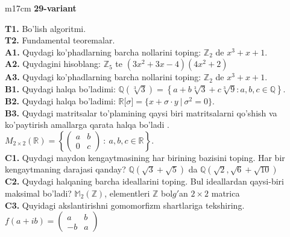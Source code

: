 \documentclass{article}
\begin{document}
\begin{tabular}{m{17cm}}
\textbf{29-variant}
\newline

\textbf{T1.} Bo'lish algoritmi. \\
\textbf{T2.} Fundamental teoremalar. \\
\textbf{A1.} Quydagi ko'phadlarning barcha nollarini toping:
\(\mathbb{Z}_{2}\) de \(x^{3} + x + 1\). \\
\textbf{A2.} Quydagini hisoblang:
\(\mathbb{Z}_{5}\) te \(\left( 3x^{2} + 3x - 4 \right)\left( 4x^{2} + 2 \right)\) \\
\textbf{A3.} Quydagi ko'phadlarning barcha nollarini toping:
\(\mathbb{Z}_{2}\) de \(x^{3} + x + 1\). \\
\textbf{B1.} Quydagi halqa bo'ladimi:
\(\mathbb{Q}\left( \sqrt[3]{3} \right) = \left\{ a + b\sqrt[3]{3} + c\sqrt[3]{9}:a,b,c \in \mathbb{Q} \right\}\). \\
\textbf{B2.} Quydagi halqa bo'ladimi:
\(\mathbb{R\lbrack}\sigma\rbrack = \{ x + \sigma \cdot y\ |\ \sigma^{2} = 0\}\). \\
\textbf{B3.} Quydagi matritsalar to'plamining qaysi biri matritsalarni qo'shish va ko'paytirish amallarga qarata halqa bo'ladi .
\(M_{2 \times 2}\mathbb{(R) =}\left\{ \begin{pmatrix}
a & b \\
0 & c
\end{pmatrix}\ :\ a,b,c \in \mathbb{R} \right\}\). \\
\textbf{C1.} Quydagi maydon kengaytmasining har birining bazisini toping. Har bir kengaytmaning darajasi qanday?
\(\mathbb{Q}\left( \sqrt{3} + \sqrt{5} \right)\) da \(\mathbb{Q}\left( \sqrt{2},\sqrt{6} + \sqrt{10} \right)\) \\
\textbf{C2.} Quydagi halqaning barcha ideallarini toping. Bul ideallardan qaysi-biri maksimal bo'ladi?
\(\mathbb{M}_{2}\left( \mathbb{Z} \right)\), elementleri \(\mathbb{Z}\) bol\(g'\)an \(2 \times 2\) matrica \\
\textbf{C3.} Quyidagi akslantirishni gomomorfizm shartlariga tekshiring. \(f(a + ib) = \begin{pmatrix}
a & b \\
 - b & a
\end{pmatrix}\) \\

\end{tabular}
\vspace{1cm}
\end{document}
